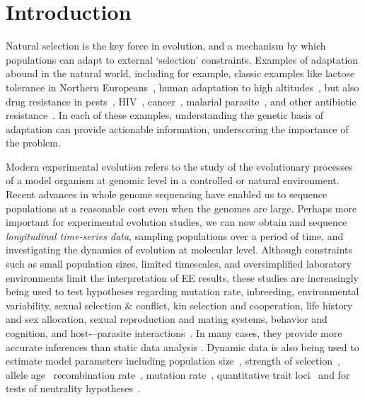 
\section{Introduction}
Natural selection is the key force in evolution, and a mechanism by
which populations can adapt to external `selection'
constraints. Examples of adaptation abound in the natural world,
including for example, classic examples like lactose tolerance in
Northern Europeans~\cite{bersaglieri2004genetic}, human adaptation to high
altitudes~\cite{yi2010sequencing,simonson2010genetic}, but also drug 
resistance in
pests~\cite{daborn2001ddt}, HIV~\cite{Feder2016More},
cancer~\cite{gottesman2002mechanisms,zahreddine2013mechanisms},
malarial parasite~\cite{ariey2014molecular,nair2007recurrent}, and
other antibiotic resistance~\cite{spellberg2008epidemic}. In each of
these examples, understanding the genetic basis of adaptation can
provide actionable information, underscoring the importance of the
problem.

Modern experimental evolution refers to the study of the evolutionary
processes of a model organism at genomic level in a controlled
\cite{hegreness2006equivalence,lang2013pervasive,orozco2012adaptation,
  lang2011genetic,barrick2009genome,bollback2007clonal,oz2014strength}
or natural
\cite{maldarelli2013hiv,reid2011new,denef2012situ,winters2012development,
  daniels2013genetic,barrett2008natural,bergland2014genomic}
environment. Recent advances in whole genome sequencing have enabled
us to sequence populations at a reasonable cost even when the genomes
are large. Perhaps more important for experimental evolution studies,
we can now obtain and sequence \emph{longitudinal time-series data},
sampling populations over a period of time, and investigating the
dynamics of evolution at molecular level.  Although constraints such
as small population sizes, limited timescales, and oversimplified
laboratory environments limit the interpretation of EE results, these
studies are increasingly being used to test hypotheses regarding
mutation rate, inbreeding, environmental variability, sexual selection
\& conflict, kin selection and cooperation, life history and sex
allocation, sexual reproduction and mating systems, behavior and
cognition, and host-–parasite
interactions~\cite{kawecki2012experimental}. In many cases, they
provide more accurate inferences than static data analysis
\cite{boyko2008assessing,desai2008polymorphism,sawyer1992population}. Dynamic
data is also being used to estimate model parameters including
population
size~\cite{williamson1999using,wang2001pseudo,pollak1983new,waples1989generalized,
  Terhorst2015Multi}, strength of
selection~\cite{mathieson2013estimating,illingworth2011distinguishing,Terhorst2015Multi,
  bollback2008estimation,illingworth2012quantifying,malaspinas2012estimating,
  Steinrücken2014a}, allele age~\cite{malaspinas2012estimating}
recombination rate~\cite{Terhorst2015Multi}, mutation
rate~\cite{Barrick2013Genome, Terhorst2015Multi}, quantitative trait
loci~\cite{baldwin2014power} and for tests of neutrality
hypotheses~\cite{feder2014Identifying,Terhorst2015Multi,burke2010genome,bergland2014genomic}.


